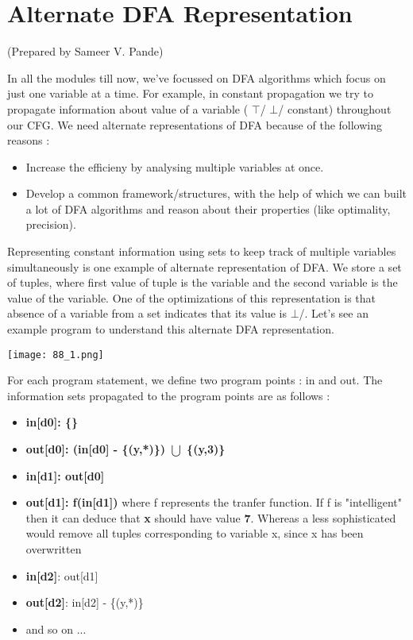 \section {Alternate DFA Representation}
\setlength{\parindent}{0pt}

(Prepared by Sameer V. Pande)

\vspace{0.3cm}


In all the modules till now, we've focussed on DFA algorithms which focus on just one variable at a time. 
For example, in constant propagation we try to propagate information about value of a variable ( $\top$/ $\bot$/ constant) throughout our CFG. 
\newline\newline
We need alternate representations of DFA because of the following reasons :
\begin{itemize}
    \item Increase the efficieny by analysing multiple variables at once.
    \item Develop a common framework/structures, with the help of which we can built a lot of DFA algorithms and reason about their properties (like optimality, precision).
\end{itemize}

Representing constant information using sets to keep track of multiple variables simultaneously is one example of alternate representation of DFA.
We store a set of tuples, where first value of tuple is the variable and the second variable is the value of the variable.
One of the optimizations of this representation is that absence of a variable from a set indicates that its value is $\bot$/. Let's see an example program to understand this alternate DFA representation.

\texttt{[image: 88\_1.png]}

For each program statement, we define two program points : in and out. The information sets propagated to the program points are as follows :
\begin{itemize}
    \item \textbf{in[d0]: \{\}}
    \item \textbf{out[d0]: (in[d0] - \{(y,*)\}) $\bigcup$ \{(y,3)\}}
    \item \textbf{in[d1]: out[d0]} 
    \item \textbf{out[d1]: f(in[d1])}
    \newline where f represents the tranfer function. If f is "intelligent" then it can deduce that \textbf{x} should have value \textbf{7}. Whereas a less sophisticated would remove all tuples corresponding to variable x, since x has been overwritten
    \item \textbf{in[d2]}: out[d1]
    \item \textbf{out[d2]}: in[d2] - \{(y,*)\}
    \item and so on ...
\end{itemize}

